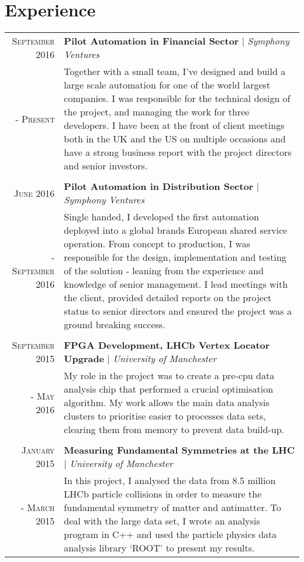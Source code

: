 \documentclass[a4paper,11pt]{article}
\begin{document}
\section{Experience}
\begin{tabular}{r|p{12.5cm}}
    \textsc{September 2016}
        & \textbf{Pilot Automation in Financial Sector} | \emph{Symphony Ventures}\\
    \textsc{ - Present}
        & \footnotesize{Together with a small team, I've designed and build a large scale automation for one of the world largest companies. I was responsible for the technical design of the project, and managing the work for three developers. I have been at the front of client meetings both in the UK and the US on multiple occasions and have a strong business report with the project directors and senior investors.}\\
    \multicolumn{2}{c}{}\\
    \textsc{June 2016}
        & \textbf{Pilot Automation in Distribution Sector} | \emph{Symphony Ventures}\\
    \textsc{ - September 2016}
        & \footnotesize{Single handed, I developed the first automation deployed into a global brands European shared service operation. From concept to production, I was responsible for the design, implementation and testing of the solution - leaning from the experience and knowledge of senior management. I lead meetings with the client, provided detailed reports on the project status to senior directors and ensured the project was a ground breaking success.}\\
    \multicolumn{2}{c}{}\\    
    \textsc{September 2015}
        & \textbf{FPGA Development, LHCb Vertex Locator Upgrade} | \emph{University of Manchester}\\
    \textsc{ - May 2016}
        & \footnotesize{My role in the project was to create a pre-cpu data analysis chip that performed a crucial optimisation algorithm. My work allows the main data analysis clusters to prioritise easier to processes data sets, clearing them from memory to prevent data build-up.}\\
    \multicolumn{2}{c}{}\\
    \textsc{January 2015}
        & \textbf{Measuring Fundamental Symmetries at the LHC} | \emph{University of Manchester}\\
    \textsc{- March 2015}
        & \footnotesize{In this project, I analysed the data from 8.5 million LHCb particle collisions in order to measure the fundamental symmetry of matter and antimatter. To deal with the large data set, I wrote an analysis program in C++ and used the particle physics data analysis library `ROOT' to present my results.}\\

\end{tabular}
\end{document}
